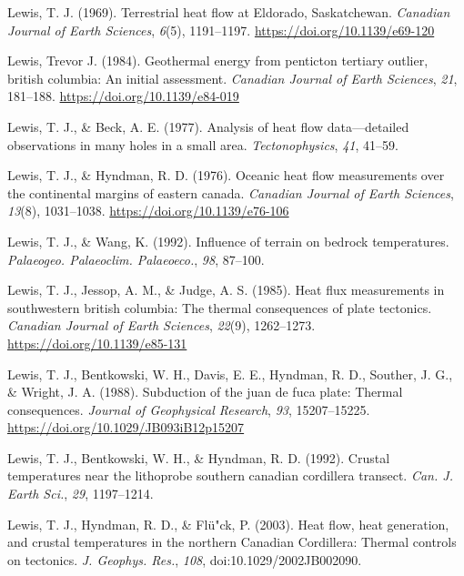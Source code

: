 \documentclass[draft,linenumbers]{agujournal2018}
\begin{document}
\leavevmode{}%
Lewis, T. J. (1969). Terrestrial heat flow at {Eldorado, Saskatchewan}.
\emph{Canadian Journal of Earth Sciences}, \emph{6}(5), 1191--1197.
\url{https://doi.org/10.1139/e69-120}

\leavevmode{}%
Lewis, Trevor J. (1984). Geothermal energy from penticton tertiary
outlier, british columbia: An initial assessment. \emph{Canadian Journal
of Earth Sciences}, \emph{21}, 181--188.
\url{https://doi.org/10.1139/e84-019}

\leavevmode{}%
Lewis, T. J., \& Beck, A. E. (1977). Analysis of heat flow
data---detailed observations in many holes in a small area.
\emph{Tectonophysics}, \emph{41}, 41--59.

\leavevmode{}%
Lewis, T. J., \& Hyndman, R. D. (1976). Oceanic heat flow measurements
over the continental margins of eastern canada. \emph{Canadian Journal
of Earth Sciences}, \emph{13}(8), 1031--1038.
\url{https://doi.org/10.1139/e76-106}

\leavevmode{}%
Lewis, T. J., \& Wang, K. (1992). Influence of terrain on bedrock
temperatures. \emph{Palaeogeo. Palaeoclim. Palaeoeco.}, \emph{98},
87--100.

\leavevmode{}%
Lewis, T. J., Jessop, A. M., \& Judge, A. S. (1985). Heat flux
measurements in southwestern british columbia: The thermal consequences
of plate tectonics. \emph{Canadian Journal of Earth Sciences},
\emph{22}(9), 1262--1273. \url{https://doi.org/10.1139/e85-131}

\leavevmode{}%
Lewis, T. J., Bentkowski, W. H., Davis, E. E., Hyndman, R. D., Souther,
J. G., \& Wright, J. A. (1988). Subduction of the juan de fuca plate:
Thermal consequences. \emph{Journal of Geophysical Research}, \emph{93},
15207--15225. \url{https://doi.org/10.1029/JB093iB12p15207}

\leavevmode{}%
Lewis, T. J., Bentkowski, W. H., \& Hyndman, R. D. (1992). Crustal
temperatures near the lithoprobe southern canadian cordillera transect.
\emph{Can. J. Earth Sci.}, \emph{29}, 1197--1214.

\leavevmode{}%
Lewis, T. J., Hyndman, R. D., \& Flü"ck, P. (2003). Heat flow, heat
generation, and crustal temperatures in the northern {Canadian
Cordillera}: Thermal controls on tectonics. \emph{J. Geophys. Res.},
\emph{108}, doi:10.1029/2002JB002090.
\end{document}
